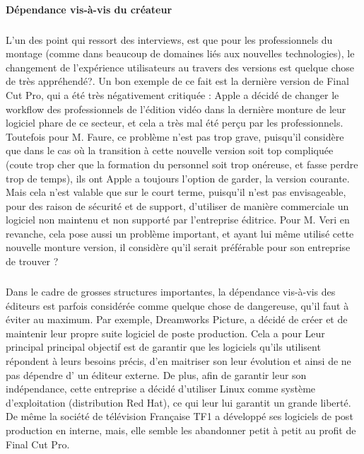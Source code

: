 \paragraph{Dépendance vis-à-vis du créateur}

\subparagraph{}

L'un des point qui ressort des interviews, est que pour les
professionnels du montage (comme dans beaucoup de domaines liés aux
nouvelles technologies), le changement de l'expérience utilisateurs
au travers des versions est quelque chose de très appréhendé?. Un
bon exemple de ce fait est la dernière version de Final Cut Pro, qui
a été très négativement critiquée \cite{FinalCutProXReviews}
: Apple a décidé de changer le workflow  des
professionnels de l'édition vidéo dans la dernière monture de leur
logiciel phare de ce secteur, et cela a très mal été perçu par
les professionnels. Toutefois pour M. Faure, ce problème n'est pas
trop grave, puisqu'il considère que dans le cas où la transition
à cette nouvelle version soit top compliquée (coute trop cher que
la formation du personnel soit trop onéreuse, et fasse perdre trop
de temps), ils ont Apple a toujours l'option de garder, la version
courante.  Mais cela n'est valable que sur le court terme, puisqu'il
n'est pas envisageable, pour des raison de sécurité et de support,
d'utiliser de manière commerciale un logiciel non maintenu et non
supporté par l'entreprise éditrice. Pour M. Veri en revanche, cela
pose aussi un problème important, et ayant lui même utilisé cette
nouvelle monture version, il considère qu'il serait préférable pour
son entreprise de trouver ?

\subparagraph{}

Dans le cadre de grosses structures importantes, la dépendance
vis-à-vis des éditeurs est parfois considérée comme quelque
chose de dangereuse, qu'il faut  à éviter au maximum. Par exemple,
Dreamworks Picture, a décidé de créer et de maintenir leur propre
suite logiciel \cite {Dreamworks} de poste production. Cela a pour Leur
principal principal objectif  est de garantir que les logiciels qu'ils
utilisent répondent à leurs besoins précis, d'en maitriser son leur
évolution et ainsi de ne pas dépendre d' un éditeur externe. De plus,
afin de garantir leur son indépendance, cette entreprise a décidé
d'utiliser Linux comme système d'exploitation (distribution Red Hat),
ce qui leur lui garantit un grande liberté. De même la société
de télévision Française TF1 a développé ses logiciels de post
production en interne, mais, elle semble les abandonner petit à petit
au profit de Final Cut Pro.

